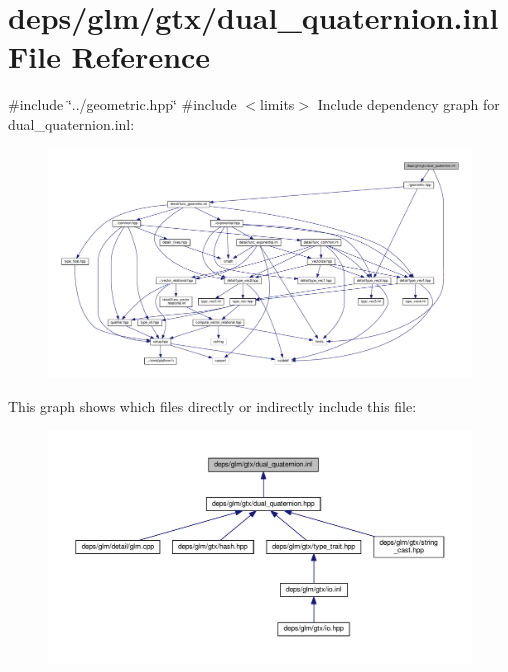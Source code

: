 \hypertarget{dual__quaternion_8inl}{}\section{deps/glm/gtx/dual\+\_\+quaternion.inl File Reference}
\label{dual__quaternion_8inl}
{\ttfamily \#include \char`\"{}../geometric.\+hpp\char`\"{}}\newline
{\ttfamily \#include $<$limits$>$}\newline
Include dependency graph for dual\+\_\+quaternion.\+inl\+:
\nopagebreak
\begin{figure}[H]
\begin{center}
\leavevmode
\includegraphics[width=350pt]{d2/d6e/dual__quaternion_8inl__incl}
\end{center}
\end{figure}
This graph shows which files directly or indirectly include this file\+:
\nopagebreak
\begin{figure}[H]
\begin{center}
\leavevmode
\includegraphics[width=350pt]{d8/d79/dual__quaternion_8inl__dep__incl}
\end{center}
\end{figure}
